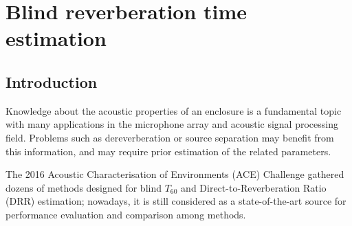 \chapter{Blind reverberation time estimation}
\label{chap:rt60}



\section{Introduction}

Knowledge about the acoustic properties of an enclosure is a fundamental topic with many applications in the microphone array and acoustic signal processing field.
Problems such as dereverberation \cite{braun2018evaluation} or source separation \cite{gannot2017consolidated} may benefit from this information, 
and may require prior estimation of the related parameters.

The 2016 Acoustic Characterisation of Environments (ACE) Challenge \cite{eaton2016estimation} gathered dozens of methods designed for blind $T_{60}$ and Direct-to-Reverberation Ratio (DRR) estimation; nowadays, it is still considered as a state-of-the-art source for 
performance evaluation and comparison among methods.

